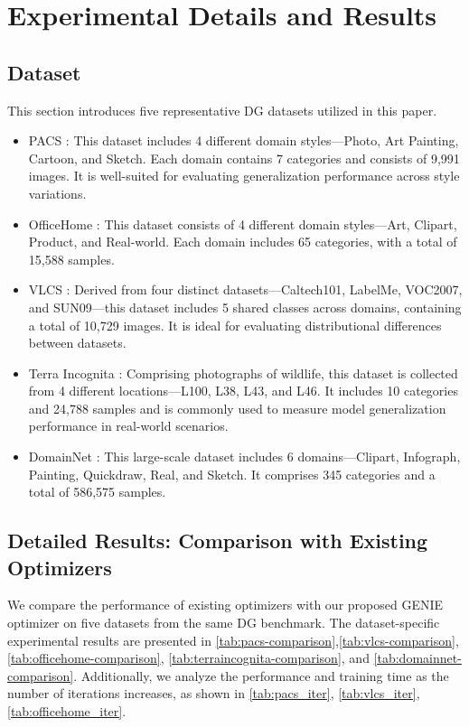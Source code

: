 \documentclass{article}
\theoremstyle{plain}
\theoremstyle{definition}
\theoremstyle{remark}
\begin{document}
\section{Experimental Details and Results}
\label{ap: Experimental Details and Results}
\subsection{Dataset}
This section introduces five representative DG datasets utilized in this paper.
\begin{itemize}
    \item PACS \cite{pacs}: This dataset includes 4 different domain styles—Photo, Art Painting, Cartoon, and Sketch. Each domain contains 7 categories and consists of 9,991 images. It is well-suited for evaluating generalization performance across style variations.
    \item OfficeHome \cite{officehome}: This dataset consists of 4 different domain styles—Art, Clipart, Product, and Real-world. Each domain includes 65 categories, with a total of 15,588 samples.
    \item VLCS \cite{vlcs}: Derived from four distinct datasets—Caltech101, LabelMe, VOC2007, and SUN09—this dataset includes 5 shared classes across domains, containing a total of 10,729 images. It is ideal for evaluating distributional differences between datasets.
    \item Terra Incognita \cite{terra}: Comprising photographs of wildlife, this dataset is collected from 4 different locations—L100, L38, L43, and L46. It includes 10 categories and 24,788 samples and is commonly used to measure model generalization performance in real-world scenarios.
    \item DomainNet \cite{domainnet}: This large-scale dataset includes 6 domains—Clipart, Infograph, Painting, Quickdraw, Real, and Sketch. It comprises 345 categories and a total of 586,575 samples.
\end{itemize}

\subsection{Detailed Results: Comparison with Existing Optimizers}
We compare the performance of existing optimizers with our proposed GENIE optimizer on five datasets from the same DG benchmark. The dataset-specific experimental results are presented in \cref{tab:pacs-comparison},\cref{tab:vlcs-comparison}, \cref{tab:officehome-comparison}, \cref{tab:terraincognita-comparison}, and \cref{tab:domainnet-comparison}. Additionally, we analyze the performance and training time as the number of iterations increases, as shown in \cref{tab:pacs_iter}, \cref{tab:vlcs_iter}, \cref{tab:officehome_iter}.
\end{document}
